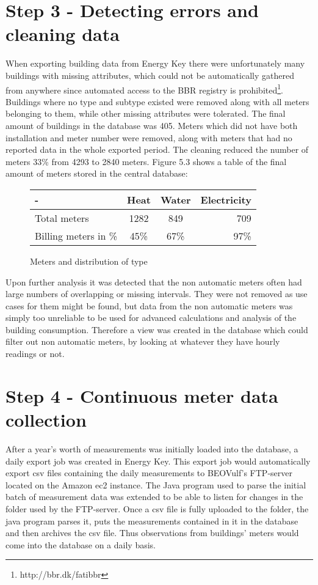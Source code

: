 \section*{Step 3 - Detecting errors and cleaning data}
When exporting building data from Energy Key there were unfortunately many buildings with missing attributes, which could not be automatically gathered from anywhere since automated access to the BBR registry is prohibited\footnote{http://bbr.dk/fatibbr}.  Buildings where no type and subtype existed were removed along with all meters belonging to them, while other missing attributes were tolerated. The final amount of buildings in the database was 405. Meters which did not have both installation and meter number were removed, along with meters that had no reported data in the whole exported period. The cleaning reduced the number of meters 33\% from 4293 to 2840 meters. Figure 5.3 shows a table of the final amount of meters stored in the central database:
\begin{figure}
\begin{center}
\begin{tabular}{| l | c | c | r |}
\hline 
  - & Heat & Water & Electricity \\ \hline 
  Total meters & 1282 & 849 & 709 \\ \hline 
  Billing meters in \% & 45\% & 67\% & 97\% \\ \hline
\end{tabular}
\end{center}
\caption{Meters and distribution of type}
\end{figure}

Upon further analysis it was detected that the non automatic meters often had large numbers of overlapping or missing intervals. They were not removed as use cases for them might be found, but data from the non automatic meters was simply too unreliable to be used for advanced calculations and analysis of the building consumption. Therefore a view was created in the database which could filter out non automatic meters, by looking at whatever they have hourly readings or not.
\section*{Step 4 - Continuous meter data collection}
After a year's worth of measurements was initially loaded into the database, a daily export job was created in Energy Key. This export job would automatically export csv files containing the daily measurements to BEOVulf’s FTP-server located on the Amazon ec2 instance. The Java program used to parse the initial batch of measurement data was extended to be able to listen for changes in the folder used by the FTP-server. Once a csv file is fully uploaded to the folder, the java program parses it, puts the measurements contained in it in the database and then archives the csv file. Thus observations from buildings’ meters would come into the database on a daily basis.
